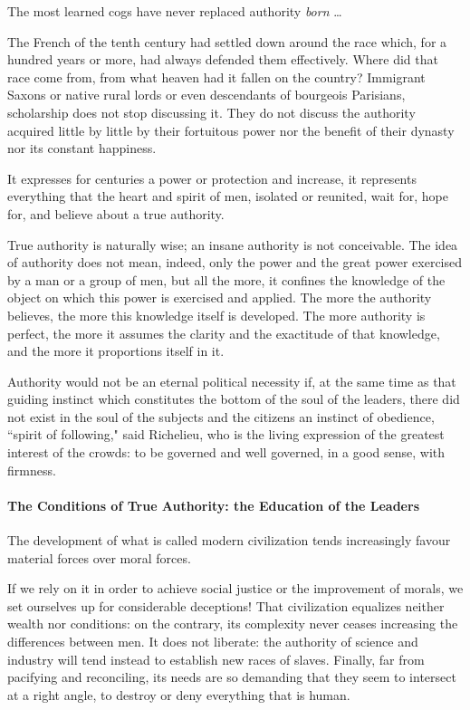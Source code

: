 The most learned cogs have never replaced authority \emph{born} …

The French of the tenth century had settled down around the race which, for a hundred years or more, had always defended them effectively. Where did that race come from, from what heaven had it fallen on the country? Immigrant Saxons or native rural lords or even descendants of bourgeois Parisians, scholarship does not stop discussing it. They do not discuss the authority acquired little by little by their fortuitous power nor the benefit of their dynasty nor its constant happiness.

It expresses for centuries a power or protection and increase, it represents everything that the heart and spirit of men, isolated or reunited, wait for, hope for, and believe about a true authority.

True authority is naturally wise; an insane authority is not conceivable. The idea of authority does not mean, indeed, only the power and the great power exercised by a man or a group of men, but all the more, it confines the knowledge of the object on which this power is exercised and applied. The more the authority believes, the more this knowledge itself is developed. The more authority is perfect, the more it assumes the clarity and the exactitude of that knowledge, and the more it proportions itself in it.

Authority would not be an eternal political necessity if, at the same time as that guiding instinct which constitutes the bottom of the soul of the leaders, there did not exist in the soul of the subjects and the citizens an instinct of obedience, ``spirit of following," said Richelieu, who is the living expression of the greatest interest of the crowds: to be governed and well governed, in a good sense, with firmness.

\paragraph{The Conditions of True Authority: the Education of the Leaders}

The development of what is called modern civilization tends increasingly favour material forces over moral forces.

If we rely on it in order to achieve social justice or the improvement of morals, we set ourselves up for considerable deceptions! That civilization equalizes neither wealth nor conditions: on the contrary, its complexity never ceases increasing the differences between men. It does not liberate: the authority of science and industry will tend instead to establish new races of slaves. Finally, far from pacifying and reconciling, its needs are so demanding that they seem to intersect at a right angle, to destroy or deny everything that is human.


